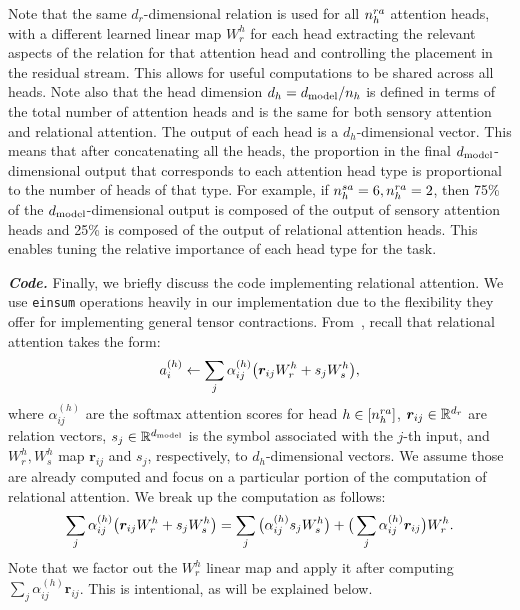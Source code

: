 Note that the same $d_r$-dimensional relation is used for all $n_h^{ra}$ attention heads, with a different learned linear map $W_r^h$ for each head extracting the relevant aspects of the relation for that attention head and controlling the placement in the residual stream. This allows for useful computations to be shared across all heads. Note also that the head dimension $d_h = d_{\mathrm{model}} / n_h$ is defined in terms of the total number of attention heads and is the same for both sensory attention and relational attention. The output of each head is a $d_h$-dimensional vector. This means that after concatenating all the heads, the proportion in the final $d_{\mathrm{model}}$-dimensional output that corresponds to each attention head type is proportional to the number of heads of that type. For example, if $n_h^{sa} = 6, n_h^{ra} = 2$, then 75\% of the $d_{\mathrm{model}}$-dimensional output is composed of the output of sensory attention heads and 25\% is composed of the output of relational attention heads. This enables tuning the relative importance of each head type for the task.

\textit{\textbf{Code.}} Finally, we briefly discuss the code implementing relational attention. We use \texttt{einsum} operations heavily in our implementation due to the flexibility they offer for implementing general tensor contractions. From~, recall that relational attention takes the form:
\begin{equation}
    a_i^{(h)} \gets \sum_{j} \alpha_{ij}^{(h)} \big(\bm{r}_{ij} W_r^h + s_j W_s^h\big),
\end{equation}
where $\alpha_{ij}^{(h)}$ are the softmax attention scores for head $h \in [n_h^{ra}]$, $\bm{r}_{ij} \in \mathbb{R}^{d_r}$ are relation vectors, $s_j \in \mathbb{R}^{d_{\mathrm{model}}}$ is the symbol associated with the $j$-th input, and $W_r^h, W_s^h$ map $\bm{r}_{ij}$ and $s_j$, respectively, to $d_h$-dimensional vectors. We assume those are already computed and focus on a particular portion of the computation of relational attention. We break up the computation as follows:
\begin{equation}
    \sum_{j} \alpha_{ij}^{(h)} \big(\bm{r}_{ij} W_r^h + s_j W_s^h\big) = \sum_{j} \big(\alpha_{ij}^{(h)} s_j W_s^h\big) + \big(\sum_{j} \alpha_{ij}^{(h)} \bm{r}_{ij}\big) W_r^h.
\end{equation}
Note that we factor out the $W_r^h$ linear map and apply it after computing $\sum_{j} \alpha_{ij}^{(h)} \bm{r}_{ij}$. This is intentional, as will be explained below.

